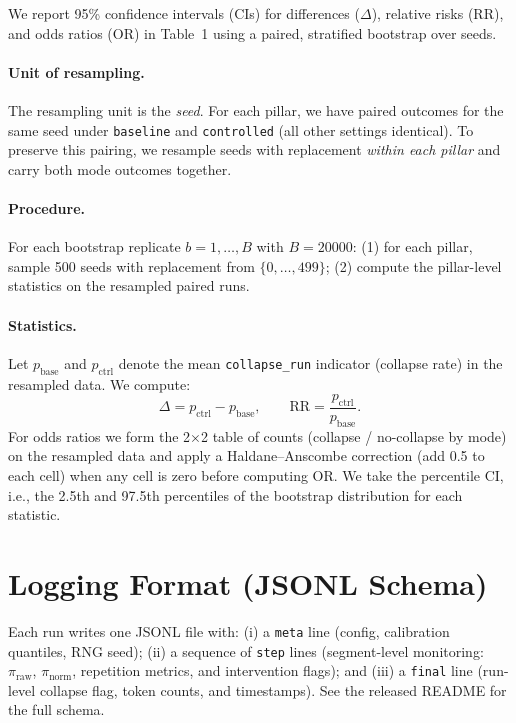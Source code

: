 \documentclass{article}
\begin{document}
We report 95\% confidence intervals (CIs) for differences (\(\Delta\)), relative risks (RR), and odds ratios (OR) in Table~1 using a paired, stratified bootstrap over seeds.

\paragraph{Unit of resampling.}
The resampling unit is the \emph{seed}. For each pillar, we have paired outcomes for the same seed under \texttt{baseline} and \texttt{controlled} (all other settings identical). To preserve this pairing, we resample seeds with replacement \emph{within each pillar} and carry both mode outcomes together.

\paragraph{Procedure.}
For each bootstrap replicate \(b=1,\dots,B\) with \(B=20000\):
(1) for each pillar, sample 500 seeds with replacement from \(\{0,\dots,499\}\);
(2) compute the pillar-level statistics on the resampled paired runs.

\paragraph{Statistics.}
Let \(p_\mathrm{base}\) and \(p_\mathrm{ctrl}\) denote the mean \texttt{collapse\_run} indicator (collapse rate) in the resampled data.
We compute:
\[
\Delta = p_\mathrm{ctrl}-p_\mathrm{base}, \qquad
\mathrm{RR} = \frac{p_\mathrm{ctrl}}{p_\mathrm{base}}.
\]
For odds ratios we form the 2\(\times\)2 table of counts (collapse / no-collapse by mode) on the resampled data and apply a Haldane--Anscombe correction (add 0.5 to each cell) when any cell is zero before computing OR.
We take the percentile CI, i.e., the 2.5th and 97.5th percentiles of the bootstrap distribution for each statistic.

\section{Logging Format (JSONL Schema)}\label{app:logging}
Each run writes one JSONL file with: (i) a \texttt{meta} line (config, calibration quantiles, RNG seed); (ii) a sequence of \texttt{step} lines (segment-level monitoring: $\pi_\text{raw}$, $\pi_\text{norm}$, repetition metrics, and intervention flags); and (iii) a \texttt{final} line (run-level collapse flag, token counts, and timestamps). See the released README for the full schema.
\end{document}
